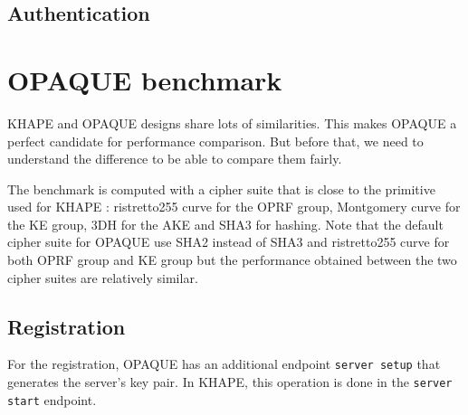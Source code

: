 ﻿\documentclass[../report.tex]{subfiles}
\begin{document}
\subsection*{Authentication}




\section{OPAQUE benchmark} %


KHAPE and OPAQUE designs share lots of similarities. This makes OPAQUE a perfect candidate for performance comparison. But before that, we need to understand the difference to be able to compare them fairly.

The benchmark is computed with a cipher suite that is close to the primitive used for KHAPE : ristretto255 curve for the OPRF group, Montgomery curve for the KE group, 3DH for the AKE and SHA3 for hashing.
Note that the default cipher suite for OPAQUE use SHA2 instead of SHA3 and ristretto255 curve for both OPRF group and KE group but the performance obtained between the two cipher suites are relatively similar.


\pgfplotsset{width=\textwidth-1.1cm}


\subsection*{Registration}
For the registration, OPAQUE has an additional endpoint \verb|server setup| that generates the server's key pair. In KHAPE, this operation is done in the \verb|server start| endpoint.
\end{document}
